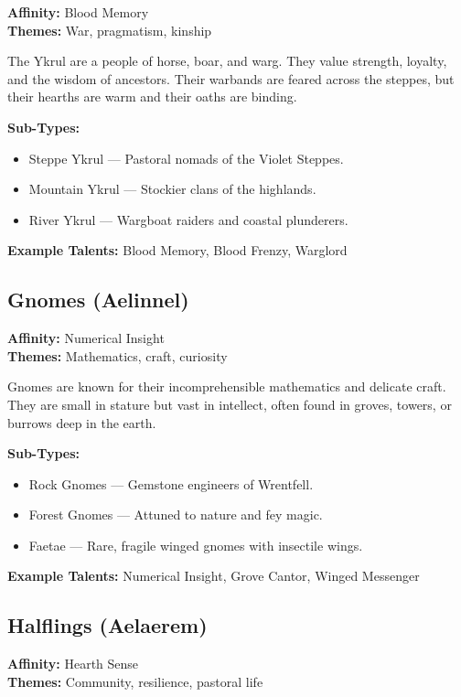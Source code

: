 \textbf{Affinity:} Blood Memory \\
\textbf{Themes:} War, pragmatism, kinship

The Ykrul are a people of horse, boar, and warg. They value strength, loyalty, and the wisdom of ancestors. Their warbands are feared across the steppes, but their hearths are warm and their oaths are binding.

\textbf{Sub-Types:}
\begin{itemize}
  \item Steppe Ykrul — Pastoral nomads of the Violet Steppes.
  \item Mountain Ykrul — Stockier clans of the highlands.
  \item River Ykrul — Wargboat raiders and coastal plunderers.
\end{itemize}

\textbf{Example Talents:} Blood Memory, Blood Frenzy, Warglord

\subsection*{Gnomes (Aelinnel)}

\textbf{Affinity:} Numerical Insight \\
\textbf{Themes:} Mathematics, craft, curiosity

Gnomes are known for their incomprehensible mathematics and delicate craft. They are small in stature but vast in intellect, often found in groves, towers, or burrows deep in the earth.

\textbf{Sub-Types:}
\begin{itemize}
  \item Rock Gnomes — Gemstone engineers of Wrentfell.
  \item Forest Gnomes — Attuned to nature and fey magic.
  \item Faetae — Rare, fragile winged gnomes with insectile wings.
\end{itemize}

\textbf{Example Talents:} Numerical Insight, Grove Cantor, Winged Messenger

\subsection*{Halflings (Aelaerem)}

\textbf{Affinity:} Hearth Sense \\
\textbf{Themes:} Community, resilience, pastoral life

